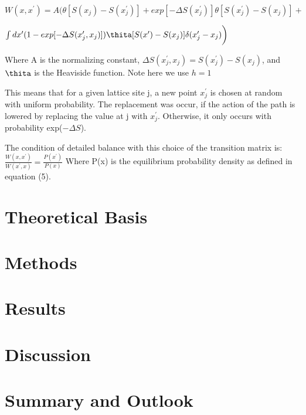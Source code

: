 \documentclass{article}
\begin{document}
$W(x, x^\prime)= A\bigg(\theta[S(x_j)-S(x_j^\prime)]+ exp[-\Delta  S(x_j^\prime)]\theta[S(x_j^\prime)- S(x_j)]+ $

$\int d x^\prime(1-exp[-\Delta S(x_j^\prime , x_j)])\thita [S(x^\prime)- S(x_j)] \delta (x_j ^\prime-x_j) \bigg)$

Where A is the normalizing constant, 
$\Delta S(x_j^\prime,x_j) = S(x_j^\prime) - S(x_j)$, and $\thita$ is the Heaviside function. Note here we use $h=1$

This means that for a given lattice site j, a new point $x_j^\prime$ is chosen at random with uniform probability. The replacement was occur, if the action of the path is lowered by replacing the value at j with $x_j^\prime$. Otherwise, it only occurs with probability exp($-\Delta S$).

The condition of detailed balance with this choice of the transition matrix is:\\
$\frac{W(x, x^\prime)}{W(x^\prime , x)}=\frac{P(x^\prime)}{P(x)}$
Where P(x) is the equilibrium probability density as defined in equation (5).

	
	\section{Theoretical Basis}
	\section{Methods}
	\section{Results}
	\section{Discussion}
	\section{Summary and Outlook}
\end{document}
